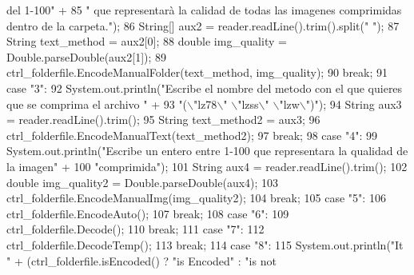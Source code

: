 \begin{DoxyCode}
{       del 1-100"} +
85                             \textcolor{stringliteral}{" que representarà la calidad de todas las imagenes comprimidas dentro de la
       carpeta."});
86                     String[] aux2 = reader.readLine().trim().split(\textcolor{stringliteral}{" "});
87                     String text\_method = aux2[0];
88                     \textcolor{keywordtype}{double} img\_quality = Double.parseDouble(aux2[1]);
89                     ctrl\_folderfile.EncodeManualFolder(text\_method, img\_quality);
90                 \textcolor{keywordflow}{break};
91                 \textcolor{keywordflow}{case} \textcolor{stringliteral}{"3"}:
92                     System.out.println(\textcolor{stringliteral}{"Escribe el nombre del metodo con el que quieres que se comprima el
       archivo "} +
93                             \textcolor{stringliteral}{"(\(\backslash\)"lz78\(\backslash\)" \(\backslash\)"lzss\(\backslash\)" \(\backslash\)"lzw\(\backslash\)")"});
94                     String aux3 = reader.readLine().trim();
95                     String text\_method2 = aux3;
96                     ctrl\_folderfile.EncodeManualText(text\_method2);
97                 \textcolor{keywordflow}{break};
98                 \textcolor{keywordflow}{case} \textcolor{stringliteral}{"4"}:
99                     System.out.println(\textcolor{stringliteral}{"Escribe un entero entre 1-100 que representara la qualidad de la
       imagen"} +
100                             \textcolor{stringliteral}{"comprimida"});
101                     String aux4 = reader.readLine().trim();
102                     \textcolor{keywordtype}{double} img\_quality2 = Double.parseDouble(aux4);
103                     ctrl\_folderfile.EncodeManualImg(img\_quality2);
104                 \textcolor{keywordflow}{break};
105                 \textcolor{keywordflow}{case} \textcolor{stringliteral}{"5"}:
106                     ctrl\_folderfile.EncodeAuto();
107                 \textcolor{keywordflow}{break};
108                 \textcolor{keywordflow}{case} \textcolor{stringliteral}{"6"}:
109                     ctrl\_folderfile.Decode();
110                 \textcolor{keywordflow}{break};
111                 \textcolor{keywordflow}{case} \textcolor{stringliteral}{"7"}:
112                     ctrl\_folderfile.DecodeTemp();
113                 \textcolor{keywordflow}{break};
114                 \textcolor{keywordflow}{case} \textcolor{stringliteral}{"8"}:
115                     System.out.println(\textcolor{stringliteral}{"It "} + (ctrl\_folderfile.isEncoded() ? \textcolor{stringliteral}{"is Encoded"} : \textcolor{stringliteral}{"is not
}
\end{DoxyCode}
